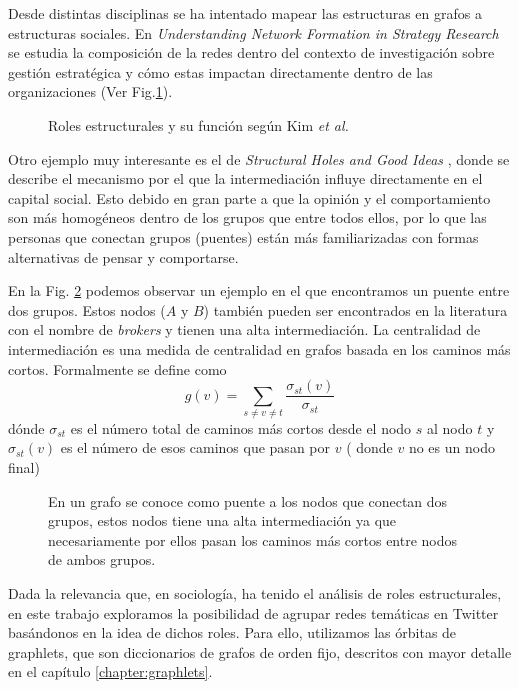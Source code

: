 Desde distintas disciplinas se ha intentado mapear las estructuras en grafos a estructuras sociales. En \textit{Understanding Network Formation in Strategy Research} \cite{rose_kim_understanding_2016} se estudia la composición de la redes dentro del contexto de investigación sobre gestión estratégica y cómo estas impactan directamente dentro de las organizaciones (Ver Fig.\ref{fig:rosekim}).

 \begin{figure}[htbp]
   \centering
   
    \caption{Roles estructurales y su función según Kim \textit{et al.} \cite{rose_kim_understanding_2016}} %
    \label{fig:rosekim}
\end{figure}

Otro ejemplo muy interesante es el de \textit{Structural Holes and Good Ideas} \cite{burt_structural_2004}, donde se describe el mecanismo por el que la intermediación influye directamente en el capital social. Esto debido en gran parte a que la opinión y el comportamiento son más homogéneos dentro de los grupos que entre todos ellos, por lo que las personas que conectan grupos (puentes) están más familiarizadas con formas alternativas de pensar y comportarse. 

En la Fig. \ref{fig:broker} podemos observar un ejemplo en el que encontramos un puente entre dos grupos.  Estos nodos ($A$ y $B$) también pueden ser encontrados en la literatura con el nombre de \textit{brokers} y tienen una alta intermediación. La centralidad de intermediación es una medida de centralidad en grafos basada en los caminos más cortos. Formalmente se define como $$g(v)=\sum _{{s\neq v\neq t}}{\frac  {\sigma _{{st}}(v)}{\sigma _{{st}}}}$$ dónde $\sigma_{st}$ es el número total de caminos más cortos desde el nodo $s$ al nodo $t$ y
$\sigma_{st}(v)$ es el número de esos caminos que pasan por $v$ ( donde $v$ no es un nodo final)

 \begin{figure}[htbp]
   \centering
   
    \caption{En un grafo se conoce como puente a los nodos que conectan dos grupos, estos nodos tiene una alta intermediación ya que necesariamente por ellos pasan los caminos más cortos entre nodos de ambos grupos.}
    \label{fig:broker}
\end{figure}

Dada la relevancia que, en sociología, ha tenido el análisis de roles estructurales, en este trabajo exploramos la posibilidad de agrupar redes temáticas en Twitter basándonos en la idea de dichos roles. Para ello, utilizamos las órbitas de graphlets, que son diccionarios de grafos de orden fijo, descritos con mayor detalle en el capítulo \ref{chapter:graphlets}.

